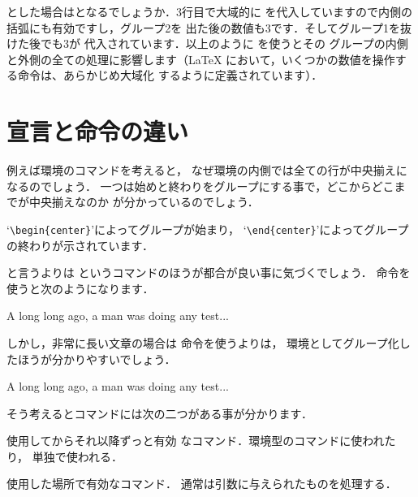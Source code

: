 \begin{InTeX}
\newcount\test \the\test
{%
   \global\test=3  \the\test%
   {%
      \the\test
      \test=5 \the\test
   }
   \the\test
}
\the\test
\test=6 \the\test
\end{InTeX}

とした場合はとなるでしょうか．3行目で大域的に
を代入していますので内側の括弧にも有効ですし，グループ2を
出た後の数値も\qu3です．そしてグループ1を抜けた後でも\qu3が
代入されています．以上のように  を使うとその
グループの内側と外側の全ての処理に影響します（\LaTeX
において，いくつかの数値を操作する命令は、あらかじめ大域化
するように定義されています）．

\section{宣言と命令の違い}
例えば環境のコマンドを考えると，
なぜ環境の内側では全ての行が中央揃えになるのでしょう．
一つは始めと終わりをグループにする事で，どこからどこまでが中央揃えなのか
が分かっているのでしょう．

`\verb|\begin{center}|'によってグループが始まり，
`\verb|\end{center}|'によってグループの終わりが示されています．

と言うよりは
というコマンドのほうが都合が良い事に気づくでしょう．
命令を使うと次のようになります．

\begin{InTeX}
{\centering A long long ago, a man was doing any test...} 
\end{InTeX}

しかし，非常に長い文章の場合は  命令を使うよりは，
環境としてグループ化したほうが分かりやすいでしょう．

\begin{InTeX}
\begin{center}
 A long long ago, a man was doing any test...
\end{center}
\end{InTeX}

そう考えるとコマンドには次の二つがある事が分かります．

\begin{description}
%
%
%
%
 \item[{宣言型コマンド}] 使用してからそれ以降ずっと有効
	    なコマンド．環境型のコマンドに使われたり，
	    単独で使われる．
 \item[{命令型コマンド}] 使用した場所で有効なコマンド．
	    通常は引数に与えられたものを処理する．
\end{description}


